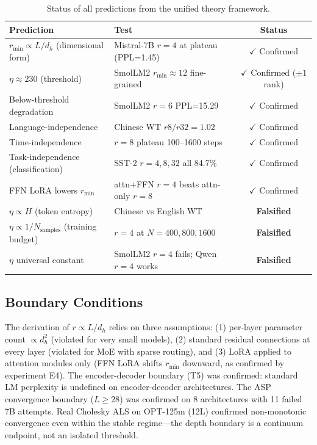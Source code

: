\documentclass[11pt]{article}
\begin{document}
\begin{table}[h]
\centering
\caption{Status of all predictions from the unified theory framework.}
\label{tab:falsify}
\begin{tabular}{@{}llc@{}}
\toprule
\textbf{Prediction} & \textbf{Test} & \textbf{Status} \\
\midrule
$r_{\min} \propto L/d_h$ (dimensional form) & Mistral-7B $r=4$ at plateau (PPL=1.45) & $\checkmark$ Confirmed \\
$\eta \approx 230$ (threshold) & SmolLM2 $r_{\min}\approx12$ fine-grained & $\checkmark$ Confirmed ($\pm1$ rank) \\
Below-threshold degradation & SmolLM2 $r=6$ PPL=15.29 & $\checkmark$ Confirmed \\
Language-independence & Chinese WT $r8/r32=1.02$ & $\checkmark$ Confirmed \\
Time-independence & $r=8$ plateau 100--1600 steps & $\checkmark$ Confirmed \\
Task-independence (classification) & SST-2 $r=4,8,32$ all 84.7\% & $\checkmark$ Confirmed \\
FFN LoRA lowers $r_{\min}$ & attn+FFN $r=4$ beats attn-only $r=8$ & $\checkmark$ Confirmed \\
$\eta \propto H$ (token entropy) & Chinese vs English WT & \textbf{Falsified} \\
$\eta \propto 1/N_{\text{samples}}$ (training budget) & $r=4$ at $N=400,800,1600$ & \textbf{Falsified} \\
$\eta$ universal constant & SmolLM2 $r=4$ fails; Qwen $r=4$ works & \textbf{Falsified} \\
\bottomrule
\end{tabular}
\end{table}

\subsection{Boundary Conditions}

The derivation of $r \propto L/d_h$ relies on three assumptions: (1) per-layer parameter count $\propto d_h^2$ (violated for very small models), (2) standard residual connections at every layer (violated for MoE with sparse routing), and (3) LoRA applied to attention modules only (FFN LoRA shifts $r_{\min}$ downward, as confirmed by experiment E4). The encoder-decoder boundary (T5) was confirmed: standard LM perplexity is undefined on encoder-decoder architectures. The ASP convergence boundary ($L \geq 28$) was confirmed on 8 architectures with 11 failed 7B attempts. Real Cholesky ALS on OPT-125m (12L) confirmed non-monotonic convergence even within the stable regime---the depth boundary is a continuum endpoint, not an isolated threshold.
\end{document}
